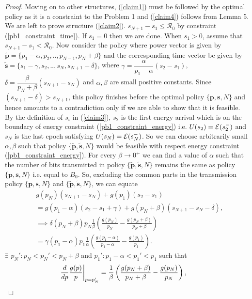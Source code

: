\begin{proof}
Moving on to other structures, (\ref{claim1}) must be followed by the optimal policy as it is a constraint to the Problem 1 and (\ref{claim4}) follows from Lemma 5. We are left to prove structure (\ref{claim2}). $s_{N+1}-s_1\le \mathcal{R}_0$ by constraint (\ref{pb1_constraint_time}). If $s_1=0$ then we are done. When $s_1>0$, assume that $s_{N+1}-s_1<\mathcal{R}_0$. Now consider the policy where power vector is given by $\bm{\widetilde{p}}=\{p_1-\alpha,p_2,..,p_{N-1},p_N+\beta \}$ and the corresponding time vector be given by $\bm{\widetilde{s}}=\{s_1-\gamma,s_2,..,s_{N},s_{N+1}-\delta\}$, where $\gamma=\dfrac{\alpha}{p_1-\alpha}(s_2-s_1)$, $\delta =\dfrac{\beta}{p_N+\beta}(s_{N+1}-s_N)$ and $\alpha ,\beta$ are small positive constants. Since $(s_{N+1}-\delta)>s_{N+1}$, this policy finishes before the optimal policy $\{\textbf{p},\textbf{s},N\}$ and hence amounts to a contradiction only if we are able to show that it is feasible. By the definition of $s_i$ in (\ref{claim3}), $s_{2}$ is the first energy arrival which is on the boundary of energy constraint (\ref{pb1_constraint_energy}) i.e. $U(s_2)=\mathcal{E}(s_2^-)$ and $s_{N}$ is the last epoch satisfying $U(s_N)=\mathcal{E}(s_N^-)$. So we can choose arbitrarily small $\alpha ,\beta$ such that policy $\{\bm{\widetilde{p}},\bm{\widetilde{s}},N\}$ would be feasible with respect energy constraint (\ref{pb1_constraint_energy}). For every $\beta\rightarrow 0^+$ we can find a value of $\alpha$ such that the number of bits transmitted in policy $\{\bm{\widetilde{p}},\bm{\widetilde{s}},N\}$ remains the same as policy $\{\textbf{p},\textbf{s},N\}$ i.e. equal to $B_0$. So, excluding the common parts in the transmission policy $\{\textbf{p},\textbf{s},N\}$ and $\{\bm{\widetilde{p}},\bm{\widetilde{s}},N\}$, we can equate
\begin{align}
&g(p_N)(s_{N+1}-s_N)+g(p_1)(s_2-s_1)\nonumber
\\
&=g(p_1-\alpha)(s_2-s_1+\gamma)+g(p_N+\beta)(s_{N+1}-s_N-\delta)\nonumber,
\\
&\implies \delta(p_N+\beta)p_N\frac{1}{\beta}\left(\frac{g(p_N)}{p_N}-\frac{g(p_N+\beta)}{p_N+\beta}\right)\nonumber
\\
&=\gamma(p_1-\alpha)p_1\frac{1}{\alpha}\left(\frac{g(p_1-\alpha)}{p_1-\alpha}-\frac{g(p_1)}{p_1}\right).\label{bits_equal}
\end{align}
$\exists$ $p_N':p_N<p_N'<p_{N}+\beta$ and $p_1':p_1-\alpha<p_1'<p_{1}$ such that
\begin{align}
&\frac{d}{dp} \frac{g(p)}{p} \bigg{\vert}_{p=p_N'}=\frac{1}{\beta}\left(\frac{g(p_N+\beta)}{p_N+\beta}-\frac{g(p_N)}{p_N}\right),\label{diff_1}

\end{align}
\end{proof}
